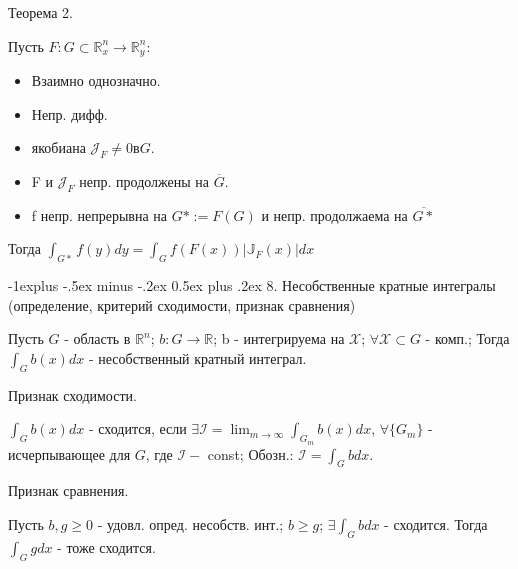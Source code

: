 \documentclass[unicode,10pt, landscape]{article}
\makeatletter
\renewcommand{\subsection}{\@startsection{subsection}{2}{0mm}%
                                {-1explus -.5ex minus -.2ex}%
                                {0.5ex plus .2ex}%
                                {\normalfont\normalsize\bfseries}}
\makeatother
\begin{document}
\begin{multicols}{4}
 Теорема 2.
 \begin{Th}
  Пусть $F: G \subset \mathbb{R}^n_x \to \mathbb{R}^n_y$:
  \begin{itemize}
   \item Взаимно однозначно.
   \item Непр. дифф.
   \item якобиана $\mathcal{J}_F \neq 0 в G$.
   \item F и $\mathcal{J}_F$ непр. продолжены на $\overline{G}$.
   \item f непр. непрерывна на $G* := F(G)$ и непр. продолжаема на $\overline{G*}$
  \end{itemize}
  Тогда $\int_{G*}f(y)dy = \int_{G}f(F(x))|\mathbb{J}_F(x)|dx$
 \end{Th}


 \subsection{8. Несобственные кратные интегралы (определение, критерий сходимости, признак сравнения)}
 \begin{Def}
  Пусть $G$ - область в $\mathbb{R}^n$; $b: G \to \mathbb{R}$; b - интегрируема на $\mathcal{X}$; $\forall \mathcal{X} \subset G$ - комп.; Тогда $\int_G b(x)dx$ - несобственный кратный интеграл.
 \end{Def}
 Признак сходимости.
 \begin{Def}
  $\int_G b(x)dx$ - сходится, если $\exists \mathcal{I} = \lim_{m \to \infty} \int_{G_m}b(x)dx$, $\forall\{ G_m \}$ - исчерпывающее для $G$, где $\mathcal{I} - $ const; Обозн.: $\mathcal{I} = \int_G bdx$.
 \end{Def}
 Признак сравнения.
 \begin{Th}
  Пусть $b, g \geq 0$ - удовл. опред. несобств. инт.; $b \geq g$; $\exists \int_G bdx$ - сходится. Тогда $\int_G gdx$ - тоже сходится.
 \end{Th}



\end{multicols}
\end{document}
